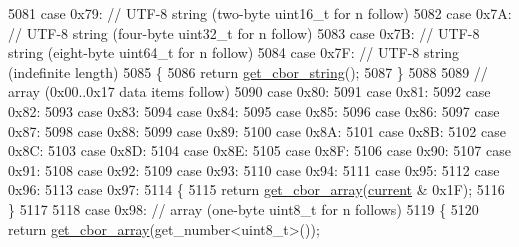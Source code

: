 \begin{DoxyCode}
5081             \textcolor{keywordflow}{case} 0x79: \textcolor{comment}{// UTF-8 string (two-byte uint16\_t for n follow)}
5082             \textcolor{keywordflow}{case} 0x7A: \textcolor{comment}{// UTF-8 string (four-byte uint32\_t for n follow)}
5083             \textcolor{keywordflow}{case} 0x7B: \textcolor{comment}{// UTF-8 string (eight-byte uint64\_t for n follow)}
5084             \textcolor{keywordflow}{case} 0x7F: \textcolor{comment}{// UTF-8 string (indefinite length)}
5085             \{
5086                 \textcolor{keywordflow}{return} \hyperlink{classnlohmann_1_1detail_1_1binary__reader_ac626ec37d1724d9d36d918c6361f8e57}{get\_cbor\_string}();
5087             \}
5088 
5089             \textcolor{comment}{// array (0x00..0x17 data items follow)}
5090             \textcolor{keywordflow}{case} 0x80:
5091             \textcolor{keywordflow}{case} 0x81:
5092             \textcolor{keywordflow}{case} 0x82:
5093             \textcolor{keywordflow}{case} 0x83:
5094             \textcolor{keywordflow}{case} 0x84:
5095             \textcolor{keywordflow}{case} 0x85:
5096             \textcolor{keywordflow}{case} 0x86:
5097             \textcolor{keywordflow}{case} 0x87:
5098             \textcolor{keywordflow}{case} 0x88:
5099             \textcolor{keywordflow}{case} 0x89:
5100             \textcolor{keywordflow}{case} 0x8A:
5101             \textcolor{keywordflow}{case} 0x8B:
5102             \textcolor{keywordflow}{case} 0x8C:
5103             \textcolor{keywordflow}{case} 0x8D:
5104             \textcolor{keywordflow}{case} 0x8E:
5105             \textcolor{keywordflow}{case} 0x8F:
5106             \textcolor{keywordflow}{case} 0x90:
5107             \textcolor{keywordflow}{case} 0x91:
5108             \textcolor{keywordflow}{case} 0x92:
5109             \textcolor{keywordflow}{case} 0x93:
5110             \textcolor{keywordflow}{case} 0x94:
5111             \textcolor{keywordflow}{case} 0x95:
5112             \textcolor{keywordflow}{case} 0x96:
5113             \textcolor{keywordflow}{case} 0x97:
5114             \{
5115                 \textcolor{keywordflow}{return} \hyperlink{classnlohmann_1_1detail_1_1binary__reader_a3ee69f0eabc2325477dd00689a00449b}{get\_cbor\_array}(\hyperlink{classnlohmann_1_1detail_1_1binary__reader_a7e994e201b215cd6d6ae28a1853f43e0}{current} & 0x1F);
5116             \}
5117 
5118             \textcolor{keywordflow}{case} 0x98: \textcolor{comment}{// array (one-byte uint8\_t for n follows)}
5119             \{
5120                 \textcolor{keywordflow}{return} \hyperlink{classnlohmann_1_1detail_1_1binary__reader_a3ee69f0eabc2325477dd00689a00449b}{get\_cbor\_array}(get\_number<uint8\_t>());

\end{DoxyCode}

